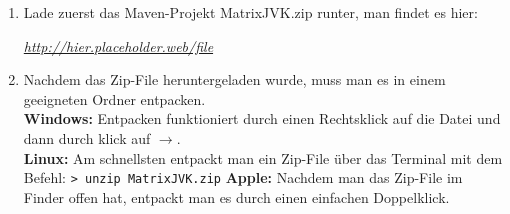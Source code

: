 
\newcommand{\jvkpackage}{MatrixJVK.zip}
\newcommand{\jvkpackageurl}{http://hier.placeholder.web/file}



\begin{Infobox}
    \begin{enumerate}[label=\arabic*.]
        \item Lade zuerst das Maven-Projekt \jvkpackage { }runter, man findet es hier:
        \begin{center}
            \color{blue}\href{\jvkpackageurl}{\textit{\jvkpackageurl}}
        \end{center}

        \item Nachdem das Zip-File heruntergeladen wurde, muss man es in einem geeigneten Ordner entpacken.\\
        \textbf{Windows:} Entpacken funktioniert durch einen Rechtsklick auf die Datei und dann durch klick auf $\to$.\\
        \textbf{Linux:} Am schnellsten entpackt man ein Zip-File über das Terminal mit dem Befehl:
        \newline\hspace*{\fill}\texttt{\textgreater\ unzip \jvkpackage}\hspace*{\fill}\newline
        \textbf{Apple:} Nachdem man das Zip-File im Finder offen hat, entpackt man es durch einen einfachen Doppelklick.
    \end{enumerate}
\end{Infobox}



